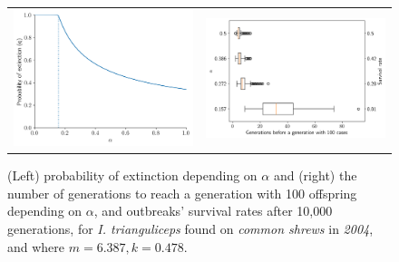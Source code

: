 \documentclass{article}
\begin{document}
\begin{figure}[]
	\begin{mdframed}[backgroundcolor=grey250,rightline=false,leftline=false,topline=false]
		\centering
		\begin{tabular}{ll}
			\includegraphics[width=.46\linewidth,valign=m]{extinctionProbability2004_I. trianguliceps_SA} & \includegraphics[width=.50\linewidth,valign=m]{firstGeneration100_2004_I. trianguliceps_SA}
		\end{tabular}
		\caption{(Left) probability of extinction depending on $ \alpha $ and (right) the number of generations to reach a generation with 100 offspring depending on $ \alpha $, and  outbreaks' survival rates after 10,000 generations, for \textit{I. trianguliceps} found on \textit{common shrews} in \textit{2004}, and where $ m = 6.387, k = 0.478 $. }
		\label{fig:simulation_2004_itrianguliceps_SA}
	\end{mdframed}
\end{figure}
\end{document}
